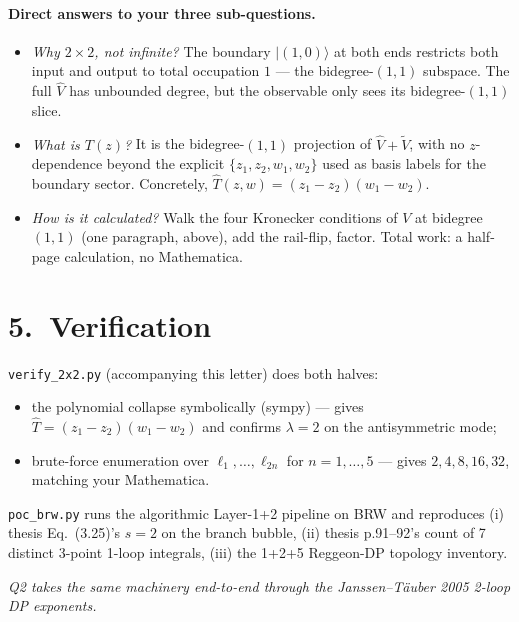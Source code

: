 \documentclass[11pt,a4paper]{article}
\begin{document}
\paragraph{Direct answers to your three sub-questions.}
\begin{itemize}[leftmargin=2em,itemsep=2pt]
  \item \emph{Why $2\times 2$, not infinite?}  The boundary $|(1,0)\rangle$ at
        both ends restricts both input and output to total occupation $1$ ---
        the bidegree-$(1,1)$ subspace.  The full $\widehat V$ has unbounded
        degree, but the observable only sees its bidegree-$(1,1)$ slice.
  \item \emph{What is $T(z)$?}  It is the bidegree-$(1,1)$ projection of
        $\widehat V + \widetilde V$, with no $z$-dependence beyond the explicit
        $\{z_1, z_2, w_1, w_2\}$ used as basis labels for the boundary sector.
        Concretely, $\widehat T(z,w) = (z_1-z_2)(w_1-w_2)$.
  \item \emph{How is it calculated?}  Walk the four Kronecker conditions of
        $V$ at bidegree $(1,1)$ (one paragraph, above), add the rail-flip,
        factor.  Total work: a half-page calculation, no Mathematica.
\end{itemize}

\section*{5.\ Verification}

\texttt{verify\_2x2.py} (accompanying this letter) does both halves:
\begin{itemize}[leftmargin=2em,itemsep=1pt]
  \item the polynomial collapse symbolically (sympy) --- gives
        $\widehat T = (z_1-z_2)(w_1-w_2)$ and confirms $\lambda{=}2$ on the
        antisymmetric mode;
  \item brute-force enumeration over $\ell_1,\dots,\ell_{2n}$ for $n=1,\dots,5$
        --- gives $2,4,8,16,32$, matching your Mathematica.
\end{itemize}
\texttt{poc\_brw.py} runs the algorithmic Layer-1+2 pipeline on BRW and
reproduces (i) thesis Eq.\ (3.25)'s $s = 2$ on the branch bubble, (ii) thesis
p.91--92's count of 7 distinct 3-point 1-loop integrals, (iii) the 1+2+5
Reggeon-DP topology inventory.

\medskip
\noindent\emph{Q2 takes the same machinery end-to-end through the
Janssen--T\"auber 2005 2-loop DP exponents.}
\end{document}
